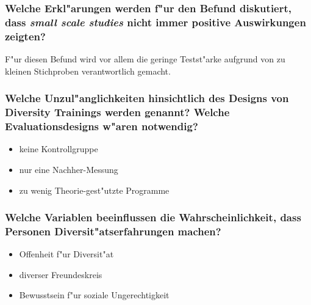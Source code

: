 \subsubsection{Welche Erkl"arungen werden f"ur den Befund diskutiert, dass \emph{small scale studies} nicht immer positive Auswirkungen zeigten?}
F"ur diesen Befund wird vor allem die geringe Testst"arke aufgrund von zu kleinen Stichproben verantwortlich gemacht.

\subsubsection{Welche Unzul"anglichkeiten hinsichtlich des Designs von Diversity Trainings werden genannt? Welche Evaluationsdesigns w"aren notwendig?}
\begin{itemize}
        \item keine Kontrollgruppe
        \item nur eine Nachher-Messung
        \item zu wenig Theorie-gest"utzte Programme
\end{itemize}

\subsubsection{Welche Variablen beeinflussen die Wahrscheinlichkeit, dass Personen Diversit"atserfahrungen machen?}
\begin{itemize}
        \item Offenheit f"ur Diversit"at
        \item diverser Freundeskreis
        \item Bewusstsein f"ur soziale Ungerechtigkeit
\end{itemize}

